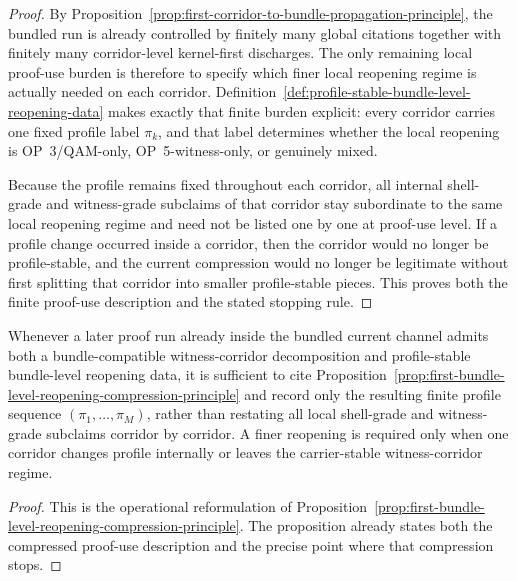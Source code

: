 \begin{proof}
By Proposition~\ref{prop:first-corridor-to-bundle-propagation-principle}, the bundled run is already controlled by finitely many global citations together with finitely many corridor-level kernel-first discharges. The only remaining local proof-use burden is therefore to specify which finer local reopening regime is actually needed on each corridor. Definition~\ref{def:profile-stable-bundle-level-reopening-data} makes exactly that finite burden explicit: every corridor carries one fixed profile label $\pi_k$, and that label determines whether the local reopening is OP~3/QAM-only, OP~5-witness-only, or genuinely mixed.

Because the profile remains fixed throughout each corridor, all internal shell-grade and witness-grade subclaims of that corridor stay subordinate to the same local reopening regime and need not be listed one by one at proof-use level. If a profile change occurred inside a corridor, then the corridor would no longer be profile-stable, and the current compression would no longer be legitimate without first splitting that corridor into smaller profile-stable pieces. This proves both the finite proof-use description and the stated stopping rule.
\end{proof}

\begin{corollary}
\label{cor:use-rule-for-the-first-bundle-level-reopening-compression-principle}
Whenever a later proof run already inside the bundled current channel admits both a bundle-compatible witness-corridor decomposition and profile-stable bundle-level reopening data, it is sufficient to cite Proposition~\ref{prop:first-bundle-level-reopening-compression-principle} and record only the resulting finite profile sequence $(\pi_1,\ldots,\pi_M)$, rather than restating all local shell-grade and witness-grade subclaims corridor by corridor. A finer reopening is required only when one corridor changes profile internally or leaves the carrier-stable witness-corridor regime.
\end{corollary}

\begin{proof}
This is the operational reformulation of Proposition~\ref{prop:first-bundle-level-reopening-compression-principle}. The proposition already states both the compressed proof-use description and the precise point where that compression stops.
\end{proof}




